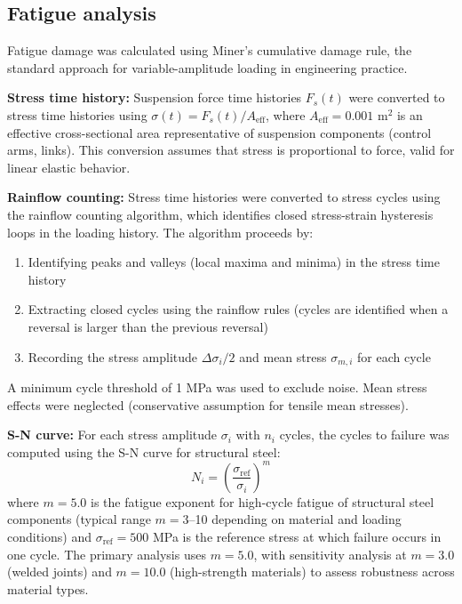 \documentclass[11pt]{article}
\begin{document}
\subsection*{Fatigue analysis}

Fatigue damage was calculated using Miner's cumulative damage rule\cite{Miner1945}, the standard approach for variable-amplitude loading in engineering practice.

\textbf{Stress time history:} Suspension force time histories $F_s(t)$ were converted to stress time histories using $\sigma(t) = F_s(t)/A_{\text{eff}}$, where $A_{\text{eff}} = 0.001$ m$^2$ is an effective cross-sectional area representative of suspension components (control arms, links). This conversion assumes that stress is proportional to force, valid for linear elastic behavior.

\textbf{Rainflow counting:} Stress time histories were converted to stress cycles using the rainflow counting algorithm\cite{ASTM_E1049}, which identifies closed stress-strain hysteresis loops in the loading history. The algorithm proceeds by:
\begin{enumerate}
\item Identifying peaks and valleys (local maxima and minima) in the stress time history
\item Extracting closed cycles using the rainflow rules (cycles are identified when a reversal is larger than the previous reversal)
\item Recording the stress amplitude $\Delta\sigma_i/2$ and mean stress $\sigma_{m,i}$ for each cycle
\end{enumerate}
A minimum cycle threshold of 1 MPa was used to exclude noise. Mean stress effects were neglected (conservative assumption for tensile mean stresses).

\textbf{S-N curve:} For each stress amplitude $\sigma_i$ with $n_i$ cycles, the cycles to failure was computed using the S-N curve for structural steel:
\begin{equation}
N_i = \left(\frac{\sigma_{\text{ref}}}{\sigma_i}\right)^m
\end{equation}
where $m = 5.0$ is the fatigue exponent for high-cycle fatigue of structural steel components (typical range $m = 3$--10 depending on material and loading conditions) and $\sigma_{\text{ref}} = 500$ MPa is the reference stress at which failure occurs in one cycle. The primary analysis uses $m = 5.0$, with sensitivity analysis at $m = 3.0$ (welded joints) and $m = 10.0$ (high-strength materials) to assess robustness across material types.
\end{document}

